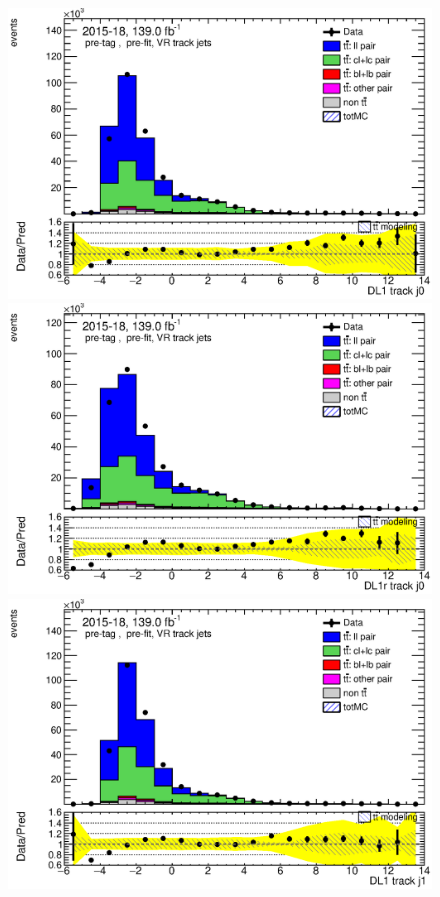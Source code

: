\documentclass[letterpaper,12pt]{article}
\begin{document}
\begin{figure}[H]
	\begin{minipage}[b]{.45\textwidth}
	\centering
	\includegraphics[width=1\textwidth]{Oct_distributions/pretagNoRwDL1rwithhighpTVRJets_scaledall/DataMC__J0_DL1.eps}
	\end{minipage}\hfill
	\begin{minipage}[b]{.45\textwidth}
	\centering
	\includegraphics[width=1\textwidth]{Oct_distributions/pretagNoRwDL1rwithhighpTVRJets_scaledall/DataMC__J0_DL1r.eps}
	\end{minipage}\hfill
	\begin{minipage}[b]{.45\textwidth}
	\centering
	\includegraphics[width=1\textwidth]{Oct_distributions/pretagNoRwDL1rwithhighpTVRJets_scaledall/DataMC__J1_DL1.eps}

\end{minipage}
\end{figure}
\end{document}
